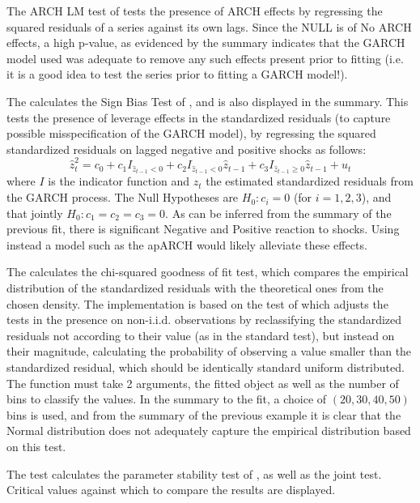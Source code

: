 The ARCH LM test of \citet{Engle1} tests the presence of ARCH effects by regressing
the squared residuals of a series against its own lags. Since the NULL is of No
ARCH effects, a high p-value, as evidenced by the summary indicates that the
GARCH model used was adequate to remove any such effects present prior to
fitting (i.e. it is a good idea to test the series prior to fitting a GARCH model!).

The \verb@signbias@ calculates the Sign Bias Test of \citet{EngleNg}, and is also
displayed in the summary. This tests the presence of leverage effects in the
standardized residuals (to capture possible misspecification of the GARCH model),
by regressing the squared standardized residuals on lagged negative and positive
shocks as follows:
\begin{equation}\label{signbias}
\hat z_t^2 = {c_0} + {c_1}{I_{{{\hat z}_{t - 1}} < 0}} + {c_2}{I_{{{\hat z}_{t - 1}} < 0}}{\hat z_{t - 1}} + {c_3}{I_{{{\hat z}_{t - 1}} \geqslant 0}}{\hat z_{t - 1}} + {u_t}
\end{equation}
where $I$ is the indicator function and $\hat z_t$ the estimated standardized residuals
from the GARCH process. The Null Hypotheses are $H_0:c_i=0$ (for $i=1,2,3$), and that
jointly $H_0:c_1=c_2=c_3=0$. As can be inferred from the summary of the previous
fit, there is significant Negative and Positive reaction to shocks. Using
instead a model such as the apARCH would likely alleviate these effects.

The \verb@gof@ calculates the chi-squared goodness of fit test, which compares
the empirical distribution of the standardized residuals with the theoretical
ones from the chosen density. The implementation is based on the test of
\citet{Palm1} which adjusts the tests in the presence on non-i.i.d. observations
by reclassifying the standardized residuals not according to their value (as in
the standard test), but instead on their magnitude, calculating the probability
of observing a value smaller than the standardized residual, which should be
identically standard uniform distributed. The function must take 2 arguments, the
fitted object as well as the number of bins to classify the values. In the
summary to the fit, a choice of $(20,30,40,50)$ bins is used, and from the
summary of the previous example it is clear that the Normal distribution does
not adequately capture the empirical distribution based on this test.

The \verb@nymblom@ test calculates the parameter stability test of \citet{Nyblom},
as well as the joint test. Critical values against which to compare the results
are displayed.

